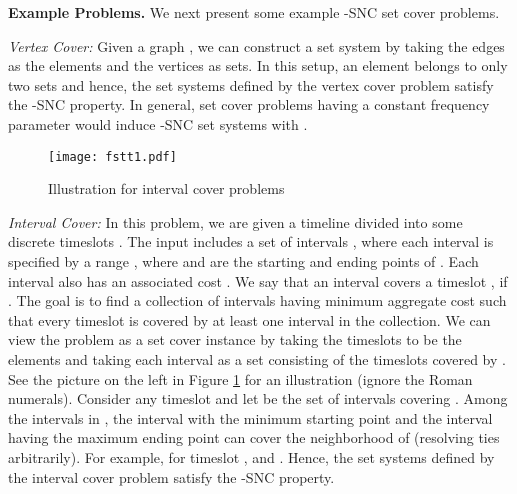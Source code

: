 \documentclass[11pt]{article}
\begin{document}
{\bf Example Problems.}
We next present some example -SNC set cover problems.

{\em Vertex Cover: }Given a graph , we can construct a set system
by taking the edges as the elements and the vertices as sets.
In this setup, an element belongs to only two sets and hence, the set systems defined by the
vertex cover problem satisfy the -SNC property.
In general, set cover problems having a constant frequency parameter  would induce
-SNC set systems with .

\begin{figure}
\begin{center}
\texttt{[image: fstt1.pdf]}
\caption{Illustration for interval cover problems}
\label{fig:interval}
\end{center}
\end{figure}


{\em Interval Cover: }
In this problem, we are given a timeline divided into some  discrete timeslots
. The input includes a set of intervals , where each interval 
is specified by a range , where  and  are the starting and ending points of .
Each interval  also has an associated cost . We say that an interval  covers a timeslot
, if . The goal is to find a collection of intervals
having minimum aggregate cost such that every timeslot  is covered by at least one interval in the collection.
We can view the problem as a set cover instance by taking the timeslots to be the elements and
taking each interval  as a set consisting of the timeslots covered by . 
See the picture on the left in Figure \ref{fig:interval} for an illustration (ignore the Roman numerals).
Consider any timeslot  and let  be the set of intervals covering .
Among the intervals in , the interval  with the minimum starting point
and the interval  having the maximum ending point can cover the neighborhood of  (resolving ties arbitrarily).
For example, for timeslot ,  and .
Hence, the set systems defined by the interval cover problem satisfy the -SNC property.
\end{document}
